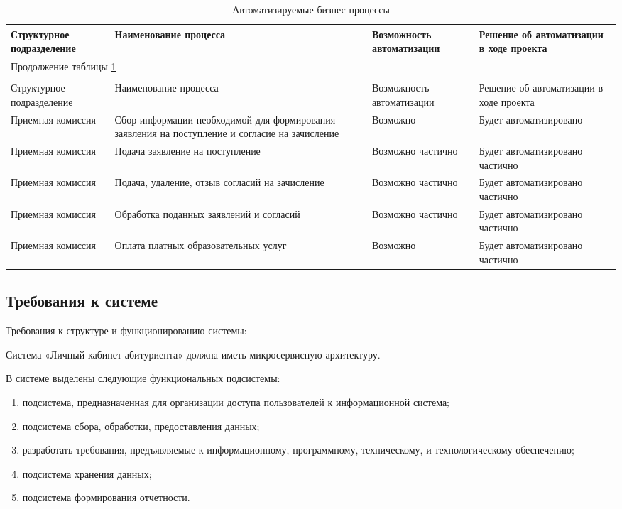 \begin{center}
\begin{longtable}{|p{3.6cm}|p{3.6cm}|p{3.6cm}|p{3.6cm}|}
\caption{Автоматизируемые бизнес-процессы}
\label{tab:processes}
\hline
Структурное подразделение & Наименование процесса & Возможность автоматизации & Решение об автоматизации в ходе проекта \\
\endfirsthead
\multicolumn{4}{l}{Продолжение таблицы \ref{tab:processes}} \\
\multicolumn{4}{l}{} \\
\hline
Структурное подразделение & Наименование процесса & Возможность автоматизации & Решение об автоматизации в ходе проекта \\
\endhead
\hline
Приемная комиссия&
Сбор информации необходимой для формирования заявления на поступление и согласие на зачисление&
Возможно&
Будет автоматизировано\\
\hline
Приемная комиссия&
Подача заявление на поступление&
Возможно частично&
Будет автоматизировано частично\\
\hline
Приемная комиссия&
Подача, удаление, отзыв согласий на зачисление&
Возможно частично&
Будет автоматизировано частично\\
\hline
Приемная комиссия&
Обработка поданных заявлений и согласий&
Возможно частично&
Будет автоматизировано частично\\
\hline
Приемная комиссия&
Оплата платных образовательных услуг&
Возможно&
Будет автоматизировано частично\\
\hline
\end{longtable}
\end{center}

\subsection{Требования к системе}

Требования к структуре и функционированию системы:

Система «Личный кабинет абитуриента» должна иметь микросервисную архитектуру.

В системе выделены следующие функциональных подсистемы:

\begin{enumerate} 
  \item подсистема, предназначенная для организации доступа пользователей к информационной система;
  
  \item подсистема сбора, обработки, предоставления данных;
  
  \item разработать требования, предъявляемые к информационному, программному, техническому, и технологическому обеспечению;
  
  \item подсистема хранения данных;
  
  \item подсистема формирования отчетности.
\end{enumerate}

